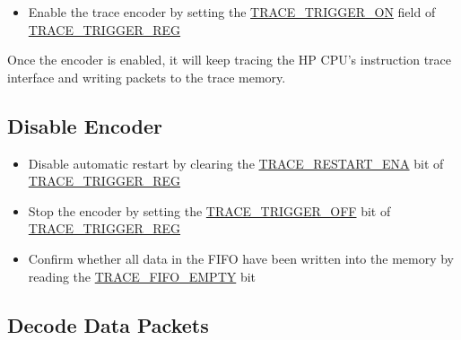 \documentclass[main\_\_EN.tex]{subfiles}
\begin{document}
\begin{itemize}
    \item Enable the trace encoder by setting the \hyperref[fielddesc:TRACETRIGGERON]{TRACE\_TRIGGER\_ON} field of \hyperref[regdesc:TRACETRIGGERREG]{TRACE\_TRIGGER\_REG}

\end{itemize}

Once the encoder is enabled, it will keep tracing the HP CPU's instruction trace interface and writing packets to the trace memory.

\subsection{Disable Encoder}


\begin{itemize}
    \item Disable automatic restart by clearing the \hyperref[fielddesc:TRACERESTARTENA]{TRACE\_RESTART\_ENA} bit of \hyperref[regdesc:TRACETRIGGERREG]{TRACE\_TRIGGER\_REG}

    \item Stop the encoder by setting the \hyperref[fielddesc:TRACETRIGGEROFF]{TRACE\_TRIGGER\_OFF} bit of \hyperref[regdesc:TRACETRIGGERREG]{TRACE\_TRIGGER\_REG}


    \item Confirm whether all data in the FIFO have been written into the memory by reading the \hyperref[fielddesc:TRACEFIFOEMPTY]{TRACE\_FIFO\_EMPTY} bit

\end{itemize}

\subsection{Decode Data Packets}
\end{document}
